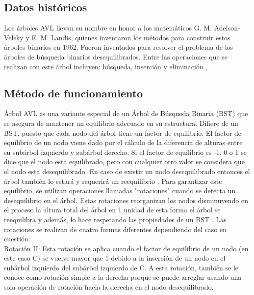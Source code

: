 \documentclass[journal]{IEEEtran}
\begin{document}
\subsection{Datos históricos}
Los árboles AVL llevan su nombre en honor a los matemáticos G. M. Adelson-Velsky y E. M. Landis, quienes inventaron los métodos para construir estos árboles binarios en 1962. Fueron inventados para resolver el problema de los árboles de búsqueda binarios desequilibrados. Entre las operaciones que se realizan con este árbol incluyen: búsqueda, inserción y eliminación \cite{Section.io}, \cite{Estructuras de datos con C++ (2a. ed.)}

\subsection{Método de funcionamiento}

Árbol AVL es una variante especial de un Árbol de Búsqueda Binaria (BST) que se asegura de mantener un equilibrio adecuado en su estructura. Difiere de un BST, puesto que cada nodo del árbol tiene un factor de equilibrio. El factor de equilibrio de un nodo viene dado por el cálculo de la diferencia de alturas entre su subárbol izquierdo y subárbol derecho. Si el factor de equilibrio es -1, 0 o 1 se dice que el nodo esta equilibrado, pero con cualquier otro valor se considera que el nodo esta desequilibrado. En caso de existir un nodo desequilibrado entonces el árbol también lo estará y requerirá un reequilibrio \cite{AVL Trees with Relaxed Balance}. Para garantizar este equilibrio, se utilizan operaciones llamadas "rotaciones" cuando se detecta un desequilibrio en el árbol. Estas rotaciones reorganizan los nodos disminuyendo en el proceso la altura total del árbol en 1 unidad de esta forma el árbol se reequilibra y además, lo hace respetando las propiedades de un BST \cite{Data Structure and Algorithms}. Las rotaciones se realizan de cuatro formas diferentes dependiendo del caso en cuestión:
\\
Rotación II: Esta rotación se aplica cuando el factor de equilibrio de un nodo (en este caso C) se vuelve mayor que 1 debido a la inserción de un nodo en el subárbol izquierdo del subárbol izquierdo de C. A esta rotación, también se le conoce como rotación simple a la derecha porque se puede arreglar usando una sola operación de rotación hacia la derecha en el nodo desequilibrado. 
\end{document}
